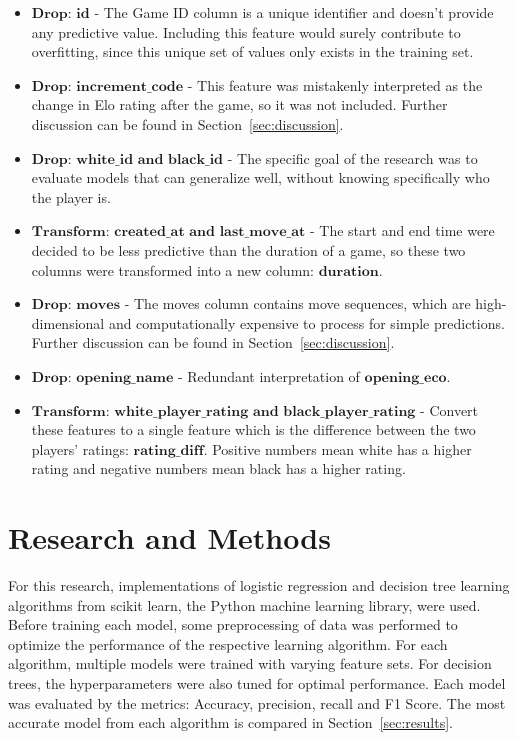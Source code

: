 \documentclass[12pt]{article}
\begin{document}
\begin{itemize}[label={}, leftmargin=0pt]
  \item $\textbf{Drop: id}$ - The Game ID column is a unique identifier and doesn’t provide any predictive value. Including this feature would surely contribute to overfitting, since this unique set of values only exists in the training set.
  \item $\textbf{Drop: increment\_code}$ - This feature was mistakenly interpreted as the change in Elo rating after the game, so it was not included. Further discussion can be found in Section~\ref{sec:discussion}.
  \item $\textbf{Drop: white\_id and black\_id}$ - The specific goal of the research was to evaluate models that can generalize well, without knowing specifically who the player is.
  \item $\textbf{Transform: created\_at and last\_move\_at}$ - The start and end time were decided to be less predictive than the duration of a game, so these two columns were transformed into a new column: $\textbf{duration}$.
  \item $\textbf{Drop: moves}$ - The moves column contains move sequences, which are high-dimensional and computationally expensive to process for simple predictions. Further discussion can be found in Section~\ref{sec:discussion}.
  \item $\textbf{Drop: opening\_name}$ - Redundant interpretation of $\textbf{opening\_eco}$.
  \item $\textbf{Transform: white\_player\_rating and black\_player\_rating}$ - Convert these features to a single feature which is the difference between the two players' ratings: $\textbf{rating\_diff}$. Positive numbers mean white has a higher rating and negative numbers mean black has a higher rating.
\end{itemize}

\section{Research and Methods}
\label{sec:methods}
For this research, implementations of logistic regression and decision tree learning algorithms from scikit learn, the Python machine learning library, were used. Before training each model, some preprocessing of data was performed to optimize the performance of the respective learning algorithm. For each algorithm, multiple models were trained with varying feature sets. For decision trees, the hyperparameters were also tuned for optimal performance. Each model was evaluated by the metrics: Accuracy, precision, recall and F1 Score. The most accurate model from each algorithm is compared in Section~\ref{sec:results}.
\end{document}
